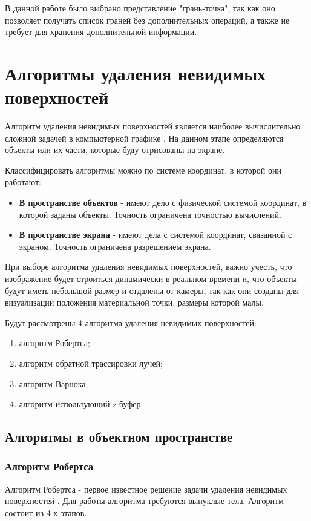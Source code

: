В данной работе было выбрано представление "грань-точка", так как оно позволяет получать список граней без дополнительных операций, а также не требует для хранения дополнительной информации.

\section{Алгоритмы удаления невидимых поверхностей}

Алгоритм удаления невидимых поверхностей является наиболее вычислительно сложной задачей в компьютерной графике \cite{rodgers}. На данном этапе определяются объекты или их части, которые буду отрисованы на экране.

Классифицировать алгоритмы можно по системе координат, в которой они работают:
\begin{itemize}
	\item\textbf{В пространстве объектов} - имеют дело с физической системой координат, в которой заданы объекты. Точность ограничена точностью вычислений.
	\item\textbf{В пространстве экрана} - имеют дела с системой координат, связанной с экраном. Точность ограничена разрешением экрана.
\end{itemize}

При выборе алгоритма удаления невидимых поверхностей, важно учесть, что изображение будет строиться динамически в реальном времени и, что объекты будут иметь небольшой размер и отдалены от камеры, так как они созданы для визуализации положения материальной точки, размеры которой малы.

Будут рассмотрены 4 алгоритма удаления невидимых поверхностей:

\begin{enumerate}
	\item алгоритм Робертса;
	\item алгоритм обратной трассировки лучей;
	\item алгоритм Варнока;
	\item алгоритм использующий z-буфер.
\end{enumerate}

\subsection{Алгоритмы в объектном пространстве}
\subsubsection{Алгоритм Робертса}
Алгоритм Робертса - первое известное решение задачи удаления невидимых поверхностей \cite{rodgers}. Для работы алгоритма требуются выпуклые тела. Алгоритм состоит из 4-х этапов.


